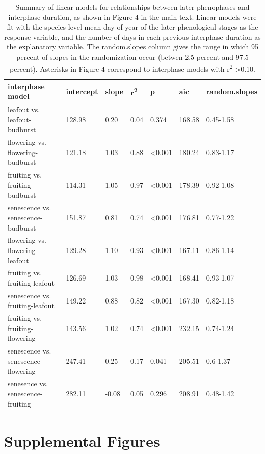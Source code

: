 \documentclass{article}
\begin{document}
\begin{table}[ht]
\centering
\caption{Summary of linear models for relationships between later phenophases and interphase duration, as shown in Figure 4 in the main text. Linear models were fit with the species-level mean day-of-year of the later phenological stages as the response variable, and the number of days in each previous interphase duration as the explanatory variable. The random.slopes column gives the range in which 95 percent of slopes in the randomization occur (betwen 2.5 percent and 97.5 percent). Asterisks in Figure 4 correspond to interphase models with r\textsuperscript{2} >0.10.} 
\label{table:interphase}
\begin{tabular}{|p{}|p{}|p{}|p{}|p{}|p{}|p{}|}
  \hline
interphase model & intercept & slope & r\textsuperscript{2} & p & aic & random.slopes \\ 
  \hline
leafout vs. leafout-budburst & 128.98 & 0.20 & 0.04 & 0.374 & 168.58 & 0.45-1.58 \\ 
  flowering vs. flowering-budburst & 121.18 & 1.03 & 0.88 & <0.001 & 180.24 & 0.83-1.17 \\ 
  fruiting vs. fruiting-budburst & 114.31 & 1.05 & 0.97 & <0.001 & 178.39 & 0.92-1.08 \\ 
  senescence vs. senescence-budburst & 151.87 & 0.81 & 0.74 & <0.001 & 176.81 & 0.77-1.22 \\ 
  flowering vs. flowering-leafout & 129.28 & 1.10 & 0.93 & <0.001 & 167.11 & 0.86-1.14 \\ 
  fruiting vs. fruiting-leafout & 126.69 & 1.03 & 0.98 & <0.001 & 168.41 & 0.93-1.07 \\ 
  senescence vs. fruiting-leafout & 149.22 & 0.88 & 0.82 & <0.001 & 167.30 & 0.82-1.18 \\ 
  fruiting vs. fruiting-flowering & 143.56 & 1.02 & 0.74 & <0.001 & 232.15 & 0.74-1.24 \\ 
  senescence vs. senescence-flowering & 247.41 & 0.25 & 0.17 & 0.041 & 205.51 & 0.6-1.37 \\ 
  senesence vs. senescence-fruiting & 282.11 & -0.08 & 0.05 & 0.296 & 208.91 & 0.48-1.42 \\ 
   \hline
\end{tabular}
\end{table}
\clearpage

\section* {Supplemental Figures}
\end{document}
